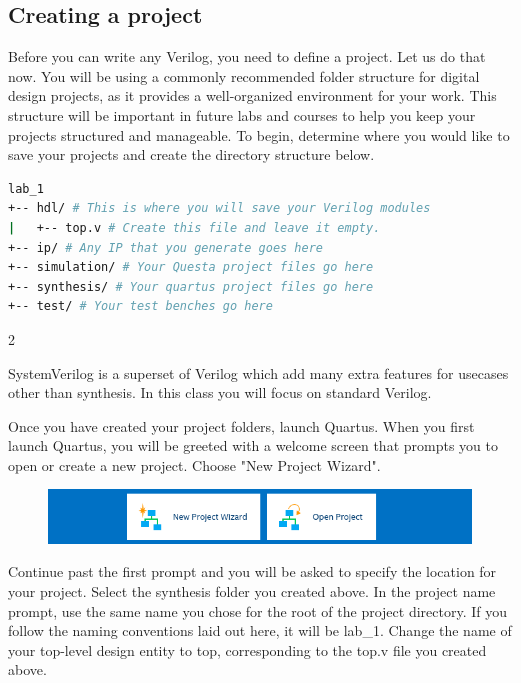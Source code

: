 \documentclass[12pt]{labmanual}
\begin{document}
\subsection{Creating a project}
Before you can write any Verilog, you need to define a project. Let us do that now. You will be using a commonly recommended folder structure for digital design projects, as it provides a well-organized environment for your work. This structure will be important in future labs and courses to help you keep your projects structured and manageable. To begin, determine where you would like to save your projects and create the directory structure below.
\clearpage
\begin{lstlisting}[style=console,language=sh]
lab_1
+-- hdl/ # This is where you will save your Verilog modules
|   +-- top.v # Create this file and leave it empty.
+-- ip/ # Any IP that you generate goes here
+-- simulation/ # Your Questa project files go here
+-- synthesis/ # Your quartus project files go here
+-- test/ # Your test benches go here
\end{lstlisting}
\vspace{4em}
\begin{paracol} {2}   
\switchcolumn[1]
\begin{extra}[frametitle={Verilog and System Verilog}]
    SystemVerilog is a superset of Verilog which add many extra features for usecases other than synthesis. In this class you will focus on standard Verilog.
\end{extra}
\switchcolumn[0]
Once you have created your project folders, launch Quartus. When you first launch Quartus, you will be greeted with a welcome screen that prompts you to open or create a new project. Choose "New Project Wizard".
\begin{figure}[H]
    \centering
    \includegraphics[width=\columnwidth]{newproject.png}
\end{figure}
\end{paracol}


Continue past the first prompt and you will be asked to specify the location for your project. Select the synthesis folder you created above. In the project name prompt, use the same name you chose for the root of the project directory. If you follow the naming conventions laid out here, it will be lab\_1. Change the name of your top-level design entity to top, corresponding to the top.v file you created above.
\end{document}
